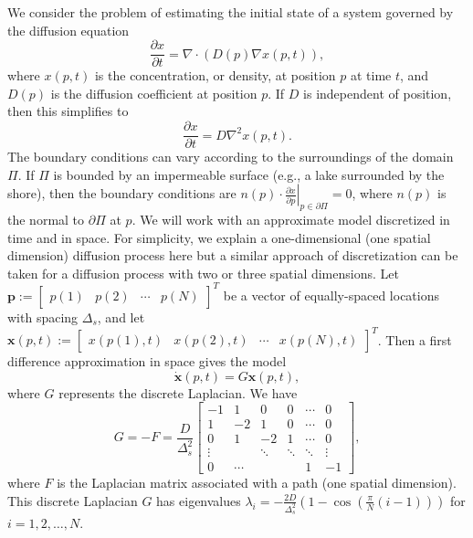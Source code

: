 \documentclass[11pt,draftcls,onecolumn]{IEEEtran}
\newcommand{\vc}[1]{\boldsymbol{#1}}
\begin{document}
We consider the problem of estimating the initial state of a system governed by the diffusion equation
\[
\frac{\partial x}{\partial t} = \nabla \cdot\left( D(p) \nabla x(p,t)\right),
\]
where $x(p,t)$ is the concentration, or density, at position $p$ at time $t$, and $D(p)$ is the diffusion coefficient at position $p$. If $D$ is independent of position, then this simplifies to
\[
\frac{\partial x}{\partial t} = D \nabla^2 x(p,t).
\]
The boundary conditions can vary according to the surroundings of the domain $\Pi$. If $\Pi$ is bounded by an impermeable surface (e.g., a lake surrounded by the shore), then the boundary conditions are $\left. n(p) \cdot \frac{\partial x}{\partial p} \right|_{p \in\partial \Pi}=0$, where $n(p)$ is the normal to $\partial \Pi$ at $p$.
We will work with an approximate model discretized in time and in space. For simplicity, we explain a one-dimensional (one spatial dimension) diffusion process here but a similar approach of discretization can be taken for a diffusion process with two or three spatial dimensions.
Let $\vc{p}:=\begin{bmatrix} p(1) & p(2) & \cdots & p(N)\end{bmatrix}^T$ be a vector of equally-spaced locations with spacing $\Delta_s$, and let $\vc{x}\left(p,t\right):=\begin{bmatrix} x(p(1),t) & x(p(2),t) & \cdots & x(p(N),t) \end{bmatrix}^T$. Then a first difference approximation in space gives the model
\begin{equation}
\dot{\vc{x}}\left(p,t\right) = G \vc{x}\left(p,t\right),
\label{eqn:conttime}
\end{equation}
where $G$ represents the discrete Laplacian. We have
\[
G = -F = \frac{D}{\Delta_s^2}\begin{bmatrix} -1 & 1 & 0 & 0 & \cdots & 0 \\
1 & -2 & 1 & 0 & \cdots & 0 \\
0 & 1 & -2 & 1 & \cdots & 0 \\
\vdots & &  \ddots & \ddots & \ddots & \vdots \\
0 & \cdots &   & & 1 & -1 \end{bmatrix},
\]
where $F$ is the Laplacian matrix associated with a path (one spatial dimension).
This discrete Laplacian $G$ has eigenvalues $\lambda_{i}=-\frac{2D}{\Delta^{2}_{s}}\left(1 - \cos\left(\frac{\pi}{N}(i-1)\right)\right)$ for $i=1, 2, \dots, N$.
\end{document}
